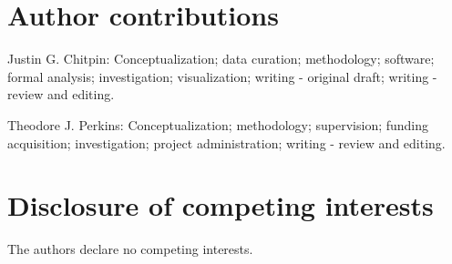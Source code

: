 \documentclass[11pt]{article}
\begin{document}
\section{Author contributions}

Justin G. Chitpin: Conceptualization; data curation; methodology; software; formal analysis; investigation; visualization; writing - original draft; writing - review and editing.

Theodore J. Perkins: Conceptualization; methodology; supervision; funding acquisition; investigation; project administration; writing - review and editing.

\section{Disclosure of competing interests}

The authors declare no competing interests.
\end{document}
